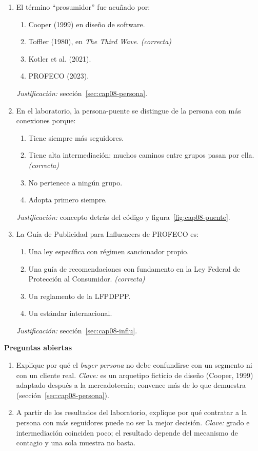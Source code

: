 \begin{enumerate}
  \item El término \enquote{prosumidor} fue acuñado por:
  \begin{enumerate}
    \item[a)] Cooper (1999) en diseño de software.
    \item[b)] Toffler (1980), en \textit{The Third Wave}. \textit{(correcta)}
    \item[c)] Kotler et al. (2021).
    \item[d)] PROFECO (2023).
  \end{enumerate}
  \textit{Justificación:} sección~\ref{sec:cap08-persona}.

  \item En el laboratorio, la persona-puente se distingue de la persona con
  más conexiones porque:
  \begin{enumerate}
    \item[a)] Tiene siempre más seguidores.
    \item[b)] Tiene alta intermediación: muchos caminos entre grupos pasan por ella. \textit{(correcta)}
    \item[c)] No pertenece a ningún grupo.
    \item[d)] Adopta primero siempre.
  \end{enumerate}
  \textit{Justificación:} concepto detrás del código y figura~\ref{fig:cap08-puente}.

  \item La Guía de Publicidad para Influencers de PROFECO es:
  \begin{enumerate}
    \item[a)] Una ley específica con régimen sancionador propio.
    \item[b)] Una guía de recomendaciones con fundamento en la Ley Federal de Protección al Consumidor. \textit{(correcta)}
    \item[c)] Un reglamento de la LFPDPPP.
    \item[d)] Un estándar internacional.
  \end{enumerate}
  \textit{Justificación:} sección~\ref{sec:cap08-influ}.
\end{enumerate}

\textbf{Preguntas abiertas}

\begin{enumerate}
  \item Explique por qué el \textit{buyer persona} no debe confundirse con un
  segmento ni con un cliente real. \textit{Clave:} es un arquetipo ficticio de
  diseño (Cooper, 1999) adaptado después a la mercadotecnia; convence más de
  lo que demuestra (sección~\ref{sec:cap08-persona}).
  \item A partir de los resultados del laboratorio, explique por qué contratar
  a la persona con más seguidores puede no ser la mejor decisión.
  \textit{Clave:} grado e intermediación coinciden poco; el resultado depende
  del mecanismo de contagio y una sola muestra no basta.
\end{enumerate}

